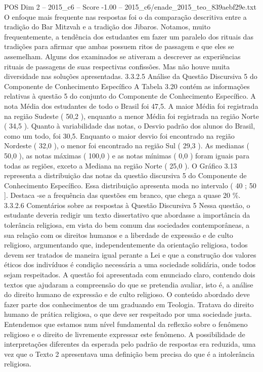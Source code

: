 \begin{textsample}{POS Dim 2 – 2015\_c6 – Score -1.00 – 2015\_c6/enade\_2015\_teo\_839aebf29e.txt}
O enfoque mais frequente nas respostas foi o da comparação descritiva entre a tradição do Bar Mitzvah e a tradição dos Jibaros.
Notamos, muito frequentemente, a tendência dos estudantes em fazer um paralelo dos rituais das tradições para afirmar que ambas possuem ritos de passagem e que eles se assemelham.
Alguns dos examinados se ativeram a descrever as experiências rituais de passagens de suas respectivas confissões.
Mas não houve muita diversidade nas soluções apresentadas. 3.3.2.5 Análise da Questão Discursiva 5 do Componente de Conhecimento Específico A Tabela 3.20 contém as informações relativas à questão 5 do conjunto do Componente de Conhecimento Específico.
A nota Média dos estudantes de todo o Brasil foi 47,5.
A maior Média foi registrada na região Sudeste ( 50,2 ), enquanto a menor Média foi registrada na região Norte ( 34,5 ).
Quanto à variabilidade das notas, o Desvio padrão dos alunos do Brasil, como um todo, foi 30,5.
Enquanto o maior desvio foi encontrado na região Nordeste ( 32,0 ), o menor foi encontrado na região Sul ( 29,3 ).
As medianas ( 50,0 ), as notas máximas ( 100,0 ) e as notas mínimas ( 0,0 ) foram iguais para todas as regiões, exceto a Mediana na região Norte ( 25,0 ).
O Gráfico 3.13 representa a distribuição das notas da questão discursiva 5 do Componente de Conhecimento Específico.
Essa distribuição apresenta moda no intervalo ( 40 ; 50 ].
Destaca -se a frequência das questões em branco, que chega a quase 20 \%. 3.3.2.6 Comentários sobre as respostas à Questão Discursiva 5 Nessa questão, o estudante deveria redigir um texto dissertativo que abordasse a importância da tolerância religiosa, em vista do bem comum das sociedades contemporâneas, a sua relação com os direitos humanos e a liberdade de expressão e de culto religioso, argumentando que, independentemente da orientação religiosa, todos devem ser tratados de maneira igual perante a Lei e que a construção dos valores éticos dos indivíduos é condição necessária a uma sociedade solidária, onde todos sejam respeitados.
A questão foi apresentada com enunciado claro, contendo dois textos que ajudaram a compreensão do que se pretendia avaliar, isto é, a análise do direito humano de expressão e de culto religioso.
O conteúdo abordado deve fazer parte dos conhecimentos de um graduando em Teologia.
Tratava do direito humano de prática religiosa, o que deve ser respeitado por uma sociedade justa.
Entendemos que estamos num nível fundamental da reflexão sobre o fenômeno religioso e o direito de livremente expressar este fenômeno.
A possibilidade de interpretações diferentes da esperada pelo padrão de respostas era reduzida, uma vez que o Texto 2 apresentava uma definição bem precisa do que é a intolerância religiosa.

\end{textsample}
